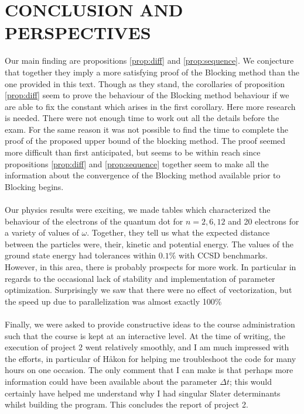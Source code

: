 \documentclass[11pt,english,a4paper]{article}
\begin{document}
\section*{\uppercase{Conclusion and perspectives}}
Our main finding are propositions \ref{prop:diff} and \ref{prop:sequence}. We conjecture that together they imply a more satisfying proof of the Blocking method than the one provided in this text. Though as they stand, the corollaries of proposition \ref{prop:diff} seem to prove the behaviour of the Blocking method behaviour if we are able to fix the constant which arises in the first corollary. Here more research is needed. There were not enough time to work out all the details before the exam. For the same reason it was not possible to find the time to complete the proof of the proposed upper bound of the blocking method. The proof seemed more difficult than first anticipated, but seems to be within reach since propositions \ref{prop:diff} and \ref{prop:sequence} together seem to make all the information about the convergence of the Blocking method available prior to Blocking begins.\\
\\
Our physics results were exciting, we made tables which characterized the behaviour of the electrons of the quantum dot for $n = 2,6,12$ and 20 electrons for a variety of values of $\omega$. Together, they tell us what the expected distance between the particles were, their, kinetic and potential energy. The values of the ground state energy had tolerances within $0.1\%$ with CCSD benchmarks. However, in this area, there is probably prospects for more work. In particular in regards to the occasional lack of stability and implementation of parameter optimization. Surprisingly we saw that there were no effect of vectorization, but the speed up due to parallelization was almost exactly 100\%\\
\\
Finally, we were asked to provide constructive ideas to the course administration such that the course is kept at an interactive level. At the time of writing, the execution of project 2 went relatively smoothly, and I am much impressed with the efforts, in particular of Håkon for helping me troubleshoot the code for many hours on one occasion. The only comment that I can make is that perhaps more information could have been available about the parameter $\Delta t$; this would certainly have helped me understand why I had singular Slater determinants whilst building the program. This concludes the report of project 2.
\end{document}
